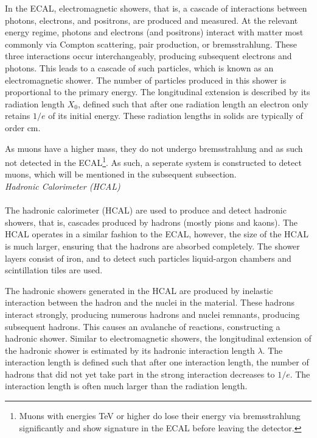 \documentclass[a4paper]{report}
\numberwithin{equation}{section}
\begin{document}
In the ECAL, electromagnetic showers, that is, a cascade of interactions between photons, electrons, and positrons, are produced and measured. At the relevant energy 
regime, photons and electrons (and positrons) interact with matter most commonly via Compton scattering, pair production, or bremsstrahlung. 
These three interactions occur interchangeably, producing subsequent electrons and photons. This leads to a cascade of such particles, which is known as an 
electromagnetic shower. The number of particles produced in this shower is proportional to the primary energy. 
The longitudinal extension is described by its radiation length $X_0$, defined such that after one radiation length an electron only retains 
$1 / e$ of its initial energy. These radiation lengths in solids are typically of order cm. \par 

As muons have a higher mass, they do not undergo bremsstrahlung and as such not detected in the ECAL\footnote{Muons with energies TeV or higher do lose their energy via 
bremsstrahlung significantly and show signature in the ECAL before leaving the detector.}. As such, a seperate system is constructed to detect muons, which will be mentioned 
in the subsequent subsection. \\

\noindent \textit{Hadronic Calorimeter (HCAL)} \\ \\
The hadronic calorimeter (HCAL) are used to produce and detect hadronic showers, that is, cascades produced by hadrons (mostly pions and kaons). 
The HCAL operates in a similar fashion to the ECAL, however, the size of the HCAL is much larger, ensuring that the hadrons are absorbed completely. The shower layers 
consist of iron, and to detect such particles liquid-argon chambers and scintillation tiles are used. \par 

The hadronic showers generated in the HCAL are produced by inelastic interaction between the hadron and the nuclei in the material. These hadrons interact strongly, 
producing numerous hadrons and nuclei remnants, producing subsequent hadrons. This causes an avalanche of reactions, constructing a hadronic shower. Similar to 
electromagnetic showers, the longitudinal extension of the hadronic shower is estimated by its hadronic interaction length $\lambda$. The interaction length is 
defined such that after one interaction length, the number of hadrons that did not yet take part in the strong interaction decreases to $1 / e$. The interaction 
length is often much larger than the radiation length. 
\end{document}
